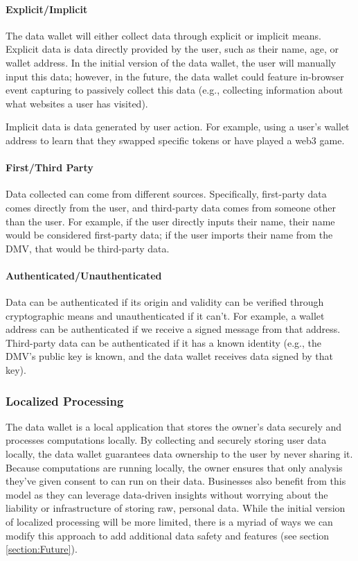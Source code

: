 \paragraph{Explicit/Implicit}
The data wallet will either collect data through explicit or implicit means. Explicit data is data directly provided by the user, such as their name, 
age, or wallet address. In the initial version of the data wallet, the user will manually input this data; however, in the future, the data wallet 
could feature in-browser event capturing to passively collect this data (e.g., collecting information about what websites a user has visited).


Implicit data is data generated by user action. For example, using a user's wallet address to learn that they swapped specific tokens or have played a web3 game. 


\paragraph{First/Third Party}
Data collected can come from different sources. Specifically, first-party data comes directly from the user, and third-party data comes from 
someone other than the user. For example, if the user directly inputs their name, their name would be considered first-party data; if the 
user imports their name from the DMV, that would be third-party data.


\paragraph{Authenticated/Unauthenticated}
Data can be authenticated if its origin and validity can be verified through cryptographic means and unauthenticated if it can't. For example, 
a wallet address can be authenticated if we receive a signed message from that address. Third-party data can be authenticated if it has a known 
identity (e.g., the DMV's public key is known, and the data wallet receives data signed by that key). 

\subsubsection{Localized Processing} %

The data wallet is a local application that stores the owner's data securely and processes computations locally. By collecting and 
securely storing user data locally, the data wallet guarantees data ownership to the user by never sharing it. Because computations 
are running locally, the owner ensures that only analysis they've given consent to can run on their data. Businesses also benefit 
from this model as they can leverage data-driven insights without worrying about the liability or infrastructure of storing raw, 
personal data. While the initial version of localized processing will be more limited, there is a myriad of ways we can modify this 
approach to add additional data safety and features (see section \ref{section:Future}). 


